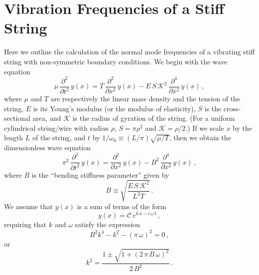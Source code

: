 %
%
%

 \section{Vibration Frequencies of a Stiff String\label{app:freq}}

Here we outline the calculation of the normal mode frequencies of a vibrating stiff string with non-symmetric boundary conditions. We begin with the wave equation~\cite{ref:fletcher1964nvf}
 \begin{equation}
\mu\, \frac{\partial^2}{\partial t^2}\, y(x) = T\, \frac{\partial^2}{\partial x^2}\, y(x) - E\, S\, \mathcal{K}^2\, \frac{\partial^4}{\partial x^2}\, y (x)\, ,
 \end{equation}
where $\mu$ and $T$ are respectively the linear mass density and the tension of the string, $E$ is its Young's modulus (or the modulus of elasticity), $S$ is the cross-sectional area, and $\mathcal{K}$ is the radius of gyration of the string. (For a uniform cylindrical string/wire with radius $\rho$, $S = \pi \rho^2$ and $\mathcal{K} = \rho/2$.) If we scale $x$ by the length $L$ of the string, and $t$ by $1/\omega_0 \equiv  (L/\pi) \sqrt{\mu/T}$, then we obtain the dimensionless wave equation
 \begin{equation} \label{eqn:wave_eqn_dim}
\pi^2\, \frac{\partial^2}{\partial t^2}\, y(x) = \frac{\partial^2}{\partial x^2}\, y(x) - B^2\, \frac{\partial^4}{\partial x^2}\, y (x)\, ,
 \end{equation}
where $B$ is the ``bending stiffness parameter'' given by
 \begin{equation}
B \equiv \sqrt{\frac{E\, S\, \mathcal{K}^2}{L^2 T}}\, .
 \end{equation}
We assume that $y(x)$ is a sum of terms of the form
 \begin{equation}
y(x) = \mathcal{C}\, e^{k\, x - i\, \omega\, t}\, ,
 \end{equation}
requiring that $k$ and $\omega$ satisfy the expression
 \begin{equation} \label{eqn:kw}
B^2 k^4 - k^2 - (\pi\, \omega)^2 = 0\, ,
 \end{equation}
or
 \begin{equation}
k^2 = \frac{1 \pm \sqrt{1 + (2\, \pi\, B\, \omega)^2}}{2\, B^2}\, .
 \end{equation}
